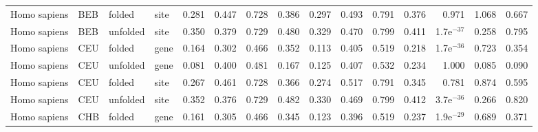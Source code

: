 \begin{longtable}{llllrrrrrrrrrrr}
        Homo sapiens &                       BEB &    folded &  site &                              0.281 &                               0.447 &                 0.728 &                 0.386 &                              0.297 &                               0.493 &                 0.791 &                 0.376 &         0.971 &  1.068 &  0.667 \\
        Homo sapiens &                       BEB &  unfolded &  site &                              0.350 &                               0.379 &                 0.729 &                 0.480 &                              0.329 &                               0.470 &                 0.799 &                 0.411 &  1.7e$^{-37}$ &  0.258 &  0.795 \\
        Homo sapiens &                       CEU &    folded &  gene &                              0.164 &                               0.302 &                 0.466 &                 0.352 &                              0.113 &                               0.405 &                 0.519 &                 0.218 &  1.7e$^{-36}$ &  0.723 &  0.354 \\
        Homo sapiens &                       CEU &  unfolded &  gene &                              0.081 &                               0.400 &                 0.481 &                 0.167 &                              0.125 &                               0.407 &                 0.532 &                 0.234 &         1.000 &  0.085 &  0.090 \\
        Homo sapiens &                       CEU &    folded &  site &                              0.267 &                               0.461 &                 0.728 &                 0.366 &                              0.274 &                               0.517 &                 0.791 &                 0.345 &         0.781 &  0.874 &  0.595 \\
        Homo sapiens &                       CEU &  unfolded &  site &                              0.352 &                               0.376 &                 0.729 &                 0.482 &                              0.330 &                               0.469 &                 0.799 &                 0.412 &  3.7e$^{-36}$ &  0.266 &  0.820 \\
        Homo sapiens &                       CHB &    folded &  gene &                              0.161 &                               0.305 &                 0.466 &                 0.345 &                              0.123 &                               0.396 &                 0.519 &                 0.237 &  1.9e$^{-29}$ &  0.689 &  0.371 \\

\end{longtable}
